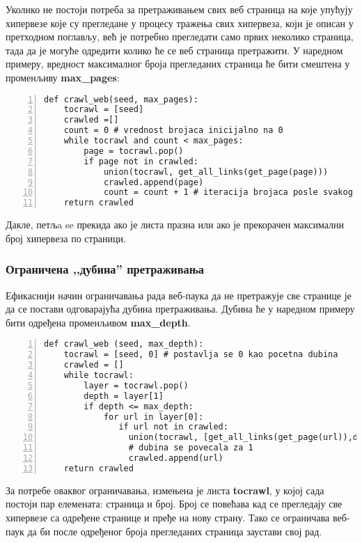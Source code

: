 Уколико не постоји потреба за претраживањем свих веб страница на које упућују
хипервезе које су прегледане у процесу тражења свих хипервеза, који је описан у претходном поглављу, већ је потребно прегледати само првих неколико страница, тада да је могуће одредити колико ће се веб страница претражити. У наредном примеру, вредност максималног броја прегледаних страница ће бити смештена у променљиву \textbf{max\_pages}:

\begin{lstlisting}[caption=Претраживање са ограниченим бројем страна, label={lst:crawlweb2}, numbers=left]
def crawl_web(seed, max_pages):
    tocrawl = [seed]
    crawled =[]
    count = 0 # vrednost brojaca inicijalno na 0
    while tocrawl and count < max_pages:
        page = tocrawl.pop()
        if page not in crawled:
            union(tocrawl, get_all_links(get_page(page)))
            crawled.append(page)
            count = count + 1 # iteracija brojaca posle svakog linka
    return crawled
\end{lstlisting}

Дакле, петљa se прекида ако је листа празна или ако је прекорачен максимални број хипервеза по страници.

\subsubsection{Ограничена ,,дубина'' претраживања}

Ефикаснији начин ограничавања рада веб-паука да не претражује све странице је да се постави одговарајућа дубина претраживања. Дубина ће у наредном примеру бити одређена променљивом \textbf{max\_depth}.

\begin{lstlisting}[caption=Скенирање ограничено по дубини, label={lst:crawlweb3}, numbers=left]
def crawl_web (seed, max_depth):
    tocrawl = [seed, 0] # postavlja se 0 kao pocetna dubina
    crawled = []
    while tocrawl:
        layer = tocrawl.pop()
        depth = layer[1]
        if depth <= max_depth:
            for url in layer[0]:
               if url not in crawled:
                 union(tocrawl, [get_all_links(get_page(url)),depth+1])
                 # dubina se povecala za 1
                 crawled.append(url)
    return crawled
\end{lstlisting}

За потребе оваквог ограничавања, измењена је листа \textbf{tocrawl}, у којој
сада постоји пар елемената: страница и број. Број се повећава кад се прегледају
све хипервезе са одређене странице и пређе на нову страну. Тако се  ограничава
веб-паук да би после одређеног броја прегледаних страница заустави свој рад.
\pagebreak
